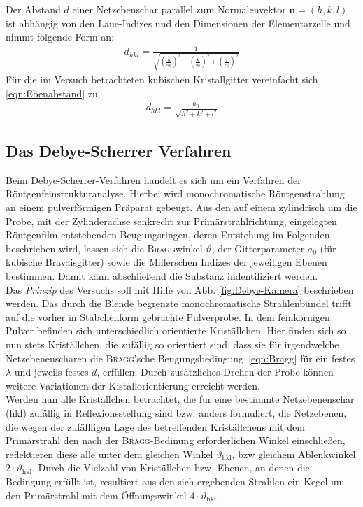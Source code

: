 \documentclass[a4paper,twoside,final]{article}
\begin{document}
Der Abstand $d$ einer Netzebenschar parallel zum Normalenvektor $\bm{n}=(h,k,l)$ ist abhängig von den Laue-Indizes und den Dimensionen der Elementarzelle und nimmt folgende Form an:
\begin{align}
  d_{hkl} = \frac{1}{\sqrt{\left(\frac{h}{a_0}\right)^2+\left(\frac{k}{b_0}\right)^2+\left(\frac{l}{c_0}\right)^2}}\label{eqn:Ebenabstand}
\end{align}
Für die im Versuch betrachteten kubischen Kristallgitter vereinfacht sich \eqref{eqn:Ebenabstand} zu
\begin{align}
  d_{hkl} = \frac{a_0}{\sqrt{h^2+k^2+l^2}}\label{eqn:Abstand_kubisch}
\end{align}

\subsection{Das Debye-Scherrer Verfahren}\label{sec:Verfahren}
Beim Debye-Scherrer-Verfahren handelt es sich um ein Verfahren der Röntgenfeinstrukturanalyse. Hierbei wird monochromatische Röntgenstrahlung an einem pulverförmigen Präparat gebeugt. Aus den auf einem zylindrisch um die Probe, mit der Zylinderachse senkrecht zur Primärstrahlrichtung, eingelegten Röntgenfilm entstehenden Beugungsringen, deren Entstehung im Folgenden beschrieben wird, lassen sich die \textsc{Bragg}winkel $\vartheta$, der Gitterparameter $a_0$ (für kubische Bravaisgitter) sowie die Millerschen Indizes der jeweiligen Ebenen bestimmen. Damit kann abschließend die Substanz indentifiziert werden.\\
Das \textit{Prinzip} des Versuchs soll mit Hilfe von Abb. \ref{fig:Debye-Kamera} beschrieben werden. Das durch die Blende begrenzte monochromatische Strahlenbündel trifft auf die vorher in Stäbchenform gebrachte Pulverprobe. In dem feinkörnigen Pulver befinden sich unterschiedlich orientierte Kriställchen. Hier finden sich so nun stets Kriställchen, die zufällig so orientiert sind, dass sie für irgendwelche Netzebenenscharen die \textsc{Bragg}'sche Beugungsbedingung~\eqref{eqn:Bragg} für ein festes $\lambda$ und jeweils festes $d$, erfüllen. Durch zusätzliches Drehen der Probe können weitere Variationen der Kistallorientierung erreicht werden.\\
Werden nun alle Kriställchen betrachtet, die für eine bestimmte Netzebenenschar (hkl) zufällig in Reflexionsstellung sind bzw. anders formuliert, die Netzebenen, die wegen der zufällligen Lage des betreffenden Kriställchens mit dem Primärstrahl den nach der \textsc{Bragg}-Bedinung erforderlichen Winkel einschließen, reflektieren diese alle unter dem gleichen Winkel $\vartheta_\text{hkl}$, bzw gleichem Ablenkwinkel $2\cdot\vartheta_\text{hkl}$. Durch die Vielzahl von Kriställchen bzw. Ebenen, an denen die Bedingung erfüllt ist, resultiert aus den sich ergebenden Strahlen ein Kegel um den Primärstrahl mit dem Öffnungswinkel $4\cdot\vartheta_\text{hkl}$. \\
\end{document}
